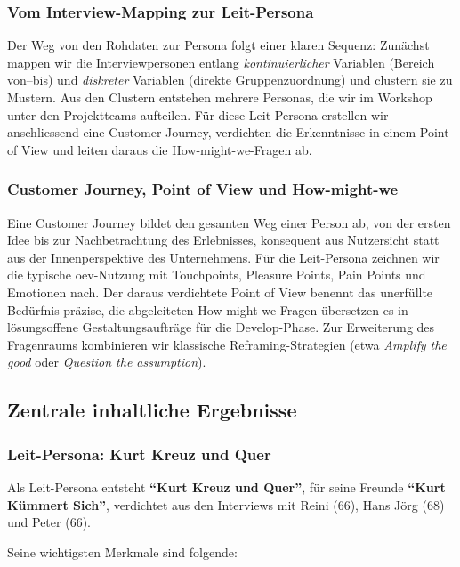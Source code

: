 \subsubsection{Vom Interview-Mapping zur Leit-Persona}

Der Weg von den Rohdaten zur Persona folgt einer klaren Sequenz: Zunächst mappen wir die Interviewpersonen entlang \emph{kontinuierlicher} Variablen (Bereich von--bis) und \emph{diskreter} Variablen (direkte Gruppenzuordnung) und clustern sie zu Mustern.
Aus den Clustern entstehen mehrere Personas, die wir im Workshop unter den Projektteams aufteilen.
Für diese Leit-Persona erstellen wir anschliessend eine Customer Journey, verdichten die Erkenntnisse in einem Point of View und leiten daraus die How-might-we-Fragen ab.

\subsubsection{Customer Journey, Point of View und How-might-we}

Eine Customer Journey bildet den gesamten Weg einer Person ab, von der ersten Idee bis zur Nachbetrachtung des Erlebnisses, konsequent aus Nutzersicht statt aus der Innenperspektive des Unternehmens.
Für die Leit-Persona zeichnen wir die typische \gls{oev}-Nutzung mit Touchpoints, Pleasure Points, Pain Points und Emotionen nach.
Der daraus verdichtete Point of View benennt das unerfüllte Bedürfnis präzise, die abgeleiteten How-might-we-Fragen übersetzen es in lösungsoffene Gestaltungsaufträge für die Develop-Phase.
Zur Erweiterung des Fragenraums kombinieren wir klassische Reframing-Strategien (etwa \emph{Amplify the good} oder \emph{Question the assumption}).

\columnbreak
\subsection{Zentrale inhaltliche Ergebnisse}

\subsubsection{Leit-Persona: Kurt Kreuz und Quer}

Als Leit-Persona entsteht \textbf{``Kurt Kreuz und Quer''}, für seine Freunde \textbf{``Kurt Kümmert Sich''}, verdichtet aus den Interviews mit Reini (66), Hans Jörg (68) und Peter (66).

Seine wichtigsten Merkmale sind folgende:

